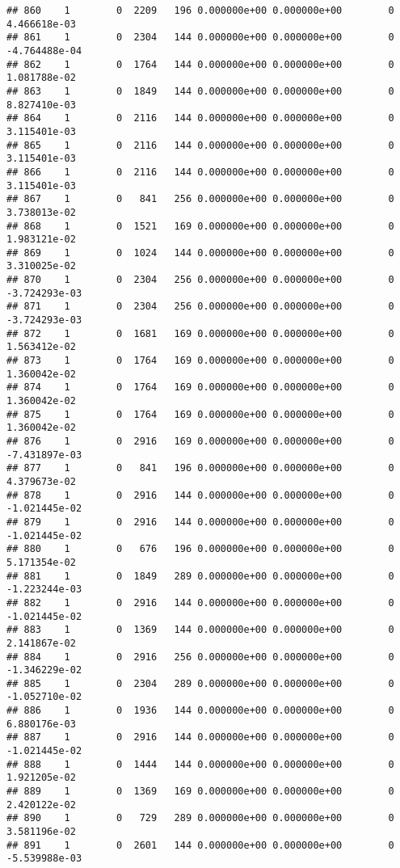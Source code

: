 \documentclass[
]{article}
\begin{document}
\begin{enumerate}
\begin{verbatim}
## 860    1        0  2209   196 0.000000e+00 0.000000e+00        0  4.466618e-03
## 861    1        0  2304   144 0.000000e+00 0.000000e+00        0 -4.764488e-04
## 862    1        0  1764   144 0.000000e+00 0.000000e+00        0  1.081788e-02
## 863    1        0  1849   144 0.000000e+00 0.000000e+00        0  8.827410e-03
## 864    1        0  2116   144 0.000000e+00 0.000000e+00        0  3.115401e-03
## 865    1        0  2116   144 0.000000e+00 0.000000e+00        0  3.115401e-03
## 866    1        0  2116   144 0.000000e+00 0.000000e+00        0  3.115401e-03
## 867    1        0   841   256 0.000000e+00 0.000000e+00        0  3.738013e-02
## 868    1        0  1521   169 0.000000e+00 0.000000e+00        0  1.983121e-02
## 869    1        0  1024   144 0.000000e+00 0.000000e+00        0  3.310025e-02
## 870    1        0  2304   256 0.000000e+00 0.000000e+00        0 -3.724293e-03
## 871    1        0  2304   256 0.000000e+00 0.000000e+00        0 -3.724293e-03
## 872    1        0  1681   169 0.000000e+00 0.000000e+00        0  1.563412e-02
## 873    1        0  1764   169 0.000000e+00 0.000000e+00        0  1.360042e-02
## 874    1        0  1764   169 0.000000e+00 0.000000e+00        0  1.360042e-02
## 875    1        0  1764   169 0.000000e+00 0.000000e+00        0  1.360042e-02
## 876    1        0  2916   169 0.000000e+00 0.000000e+00        0 -7.431897e-03
## 877    1        0   841   196 0.000000e+00 0.000000e+00        0  4.379673e-02
## 878    1        0  2916   144 0.000000e+00 0.000000e+00        0 -1.021445e-02
## 879    1        0  2916   144 0.000000e+00 0.000000e+00        0 -1.021445e-02
## 880    1        0   676   196 0.000000e+00 0.000000e+00        0  5.171354e-02
## 881    1        0  1849   289 0.000000e+00 0.000000e+00        0 -1.223244e-03
## 882    1        0  2916   144 0.000000e+00 0.000000e+00        0 -1.021445e-02
## 883    1        0  1369   144 0.000000e+00 0.000000e+00        0  2.141867e-02
## 884    1        0  2916   256 0.000000e+00 0.000000e+00        0 -1.346229e-02
## 885    1        0  2304   289 0.000000e+00 0.000000e+00        0 -1.052710e-02
## 886    1        0  1936   144 0.000000e+00 0.000000e+00        0  6.880176e-03
## 887    1        0  2916   144 0.000000e+00 0.000000e+00        0 -1.021445e-02
## 888    1        0  1444   144 0.000000e+00 0.000000e+00        0  1.921205e-02
## 889    1        0  1369   169 0.000000e+00 0.000000e+00        0  2.420122e-02
## 890    1        0   729   289 0.000000e+00 0.000000e+00        0  3.581196e-02
## 891    1        0  2601   144 0.000000e+00 0.000000e+00        0 -5.539988e-03

\end{verbatim}
\end{enumerate}
\end{document}
